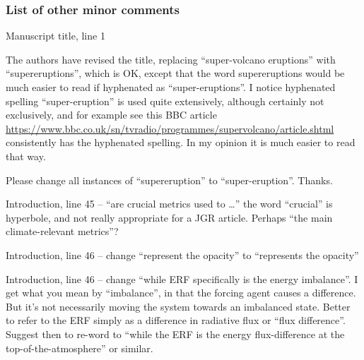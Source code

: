 \documentclass{reviewresponse}
\begin{document}
  \subsubsection*{List of other minor comments}

  \begin{revcomment}[after title={: O1}]
    Manuscript title, line 1

    The authors have revised the title, replacing ``super-volcano eruptions'' with
    ``supereruptions'', which is OK, except that the word supereruptions would be much
    easier to read if hyphenated as ``super-eruptions''. I notice hyphenated spelling
    ``super-eruption'' is used quite extensively, although certainly not exclusively,
    and for example see this BBC article
    \url{https://www.bbc.co.uk/sn/tvradio/programmes/supervolcano/article.shtml}
    consistently has the hyphenated spelling. In my opinion it is much easier to read
    that way.

    Please change all instances of ``supereruption'' to ``super-eruption''. Thanks.
  \end{revcomment}
  \begin{revresponse}[Fixed.]
  \end{revresponse}
  \begin{revcomment}[after title={: O2},colframe={colorcommentresolved}]
    Introduction, line 45 -- ``are crucial metrics used to \ldots'' the word ``crucial''
    is hyperbole, and not really appropriate for a JGR article. Perhaps ``the main
    climate-relevant metrics''?
  \end{revcomment}
  \begin{revcomment}[after title={: O3}]
    Introduction, line 46 -- change ``represent the opacity'' to ``represents the
    opacity''
  \end{revcomment}
  \begin{revresponse}[Fixed.]
  \end{revresponse}
  \begin{revcomment}[after title={: O4}]
    Introduction, line 46 -- change ``while ERF specifically is the energy imbalance''.
    I get what you mean by ``imbalance'', in that the forcing agent causes a difference.
    But it's not necessarily moving the system towards an imbalanced state. Better to
    refer to the ERF simply as a difference in radiative flux or ``flux difference''.
    Suggest then to re-word to ``while the ERF is the energy flux-difference at the
    top-of-the-atmosphere'' or similar.
  \end{revcomment}
\end{document}
